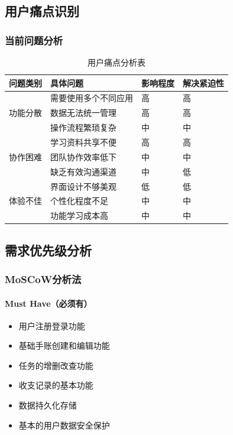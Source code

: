 \documentclass[a4paper]{article}
\begin{document}
\subsection{用户痛点识别}

\subsubsection{当前问题分析}

\begin{table}[H]
\centering
\begin{tabular}{|l|l|l|l|}
\hline
\textbf{问题类别} & \textbf{具体问题} & \textbf{影响程度} & \textbf{解决紧迫性} \\
\hline
\multirow{3}{*}{功能分散} & 需要使用多个不同应用 & 高 & 高 \\
& 数据无法统一管理 & 高 & 高 \\
& 操作流程繁琐复杂 & 中 & 中 \\
\hline
\multirow{3}{*}{协作困难} & 学习资料共享不便 & 高 & 高 \\
& 团队协作效率低下 & 中 & 中 \\
& 缺乏有效沟通渠道 & 中 & 低 \\
\hline
\multirow{3}{*}{体验不佳} & 界面设计不够美观 & 低 & 低 \\
& 个性化程度不足 & 中 & 中 \\
& 功能学习成本高 & 中 & 中 \\
\hline
\end{tabular}
\caption{用户痛点分析表}
\end{table}

\subsection{需求优先级分析}

\subsubsection{MoSCoW分析法}

\paragraph{Must Have（必须有）}
\begin{itemize}
    \item 用户注册登录功能
    \item 基础手账创建和编辑功能
    \item 任务的增删改查功能
    \item 收支记录的基本功能
    \item 数据持久化存储
    \item 基本的用户数据安全保护
\end{itemize}
\end{document}
